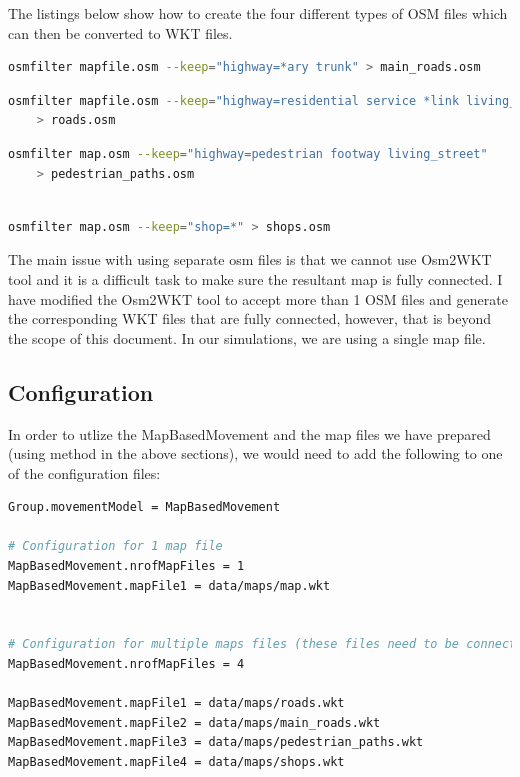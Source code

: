The listings below show how to create the four different types of OSM files which can then be converted to WKT files.
\vspace{5mm}	
\begin{lstlisting}[language=bash]
	osmfilter mapfile.osm --keep="highway=*ary trunk" > main_roads.osm	
\end{lstlisting}
\vspace{5mm}	
\begin{lstlisting}[language=bash]
	osmfilter mapfile.osm --keep="highway=residential service *link living_street"
	> roads.osm	
\end{lstlisting}
\vspace{5mm}	
\begin{lstlisting}[language=bash]
	osmfilter map.osm --keep="highway=pedestrian footway living_street"
	> pedestrian_paths.osm
	
\end{lstlisting}
\vspace{6mm}	
\begin{lstlisting}[language=bash]
	osmfilter map.osm --keep="shop=*" > shops.osm
\end{lstlisting}
\vspace{5mm}	

The main issue with using separate osm files is that we cannot use Osm2WKT tool \cite{mayer2010osm} and it is a difficult task to make sure the resultant map is fully connected. I have modified the Osm2WKT tool \cite{mayer2010osm} to accept more than 1 OSM files and generate the corresponding WKT files that are fully connected, however, that is beyond the scope of this document. In our simulations, we are using a single map file.

\subsection{Configuration}
In order to utlize the MapBasedMovement and the map files we have prepared (using method in the above sections), we would need to add the following to one of the configuration files:\newline

\begin{lstlisting}[language=bash]
Group.movementModel = MapBasedMovement

# Configuration for 1 map file
MapBasedMovement.nrofMapFiles = 1
MapBasedMovement.mapFile1 = data/maps/map.wkt


# Configuration for multiple maps files (these files need to be connected (when overlayed on each other))
MapBasedMovement.nrofMapFiles = 4

MapBasedMovement.mapFile1 = data/maps/roads.wkt
MapBasedMovement.mapFile2 = data/maps/main_roads.wkt
MapBasedMovement.mapFile3 = data/maps/pedestrian_paths.wkt
MapBasedMovement.mapFile4 = data/maps/shops.wkt

\end{lstlisting}
\newpage

